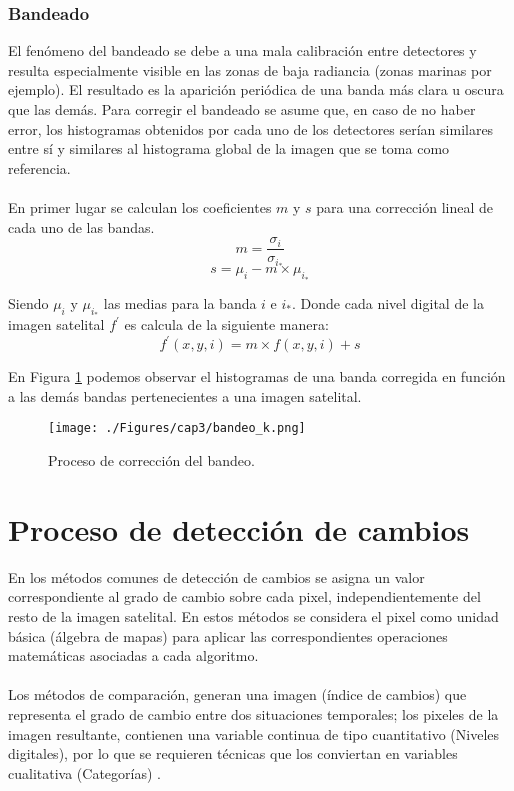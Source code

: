 \subsubsection{Bandeado}\label{subsec:bandeado}
El fen\'omeno del bandeado se debe a una mala calibraci\'on entre detectores y resulta especialmente visible en las zonas de baja radiancia (zonas marinas por ejemplo). El resultado es la aparici\'on peri\'odica de una banda m\'as clara u oscura que las dem\'as.
Para corregir el bandeado se asume que, en caso de no haber error, los histogramas obtenidos por cada uno de los detectores ser\'ian similares entre s\'i y similares al histograma global de la imagen que se toma como referencia.\\~\\
En primer lugar se calculan los coeficientes $ m $ y $ s $ para una correcci\'on lineal de cada uno de las bandas.
		\begin{equation}
		m =\dfrac{\sigma_{i}}{\sigma_{i_{*}}}
		\end{equation} 	
				\begin{equation}
				s=\mu_{i} - m \times \mu_{i_{*}}
				\end{equation} 	
				
Siendo $ \mu_{i} $ y $ \mu_{i_{*}} $ las medias para la banda $ i $ e $ i_{*} $. Donde cada nivel digital de la imagen satelital $ f^{'} $ es calcula de la siguiente manera:
				\begin{equation}
				f^{'}(x,y,i) = m \times f(x,y,i) + s
				\end{equation} 				

En Figura \ref{fig:bandeado} podemos observar el histogramas de una banda corregida en funci\'on a las dem\'as bandas pertenecientes a una imagen satelital. 
    \begin{figure}[H]
    	\centering
    	\texttt{[image: ./Figures/cap3/bandeo\_k.png]}
    	\caption{Proceso de correcci\'on del bandeo.}
    	\label{fig:bandeado}
    \end{figure}

\section{Proceso de detecci\'on de cambios}
	En los m\'etodos comunes de detecci\'on de cambios se asigna un valor correspondiente al grado de cambio sobre cada pixel, independientemente del resto de la imagen satelital. En estos m\'etodos se considera el pixel como unidad b\'asica (\'algebra de mapas) para aplicar las correspondientes operaciones matem\'aticas asociadas a cada algoritmo.\\~\\
Los m\'etodos de comparaci\'on, generan una imagen (\'indice de cambios) que representa el grado de cambio entre dos situaciones temporales; los pixeles de la imagen resultante, contienen una variable continua de tipo cuantitativo (Niveles digitales), por lo que se requieren t\'ecnicas que los conviertan en variables cualitativa (Categor\'ias) \cite{martinez2013normalizacion}.
